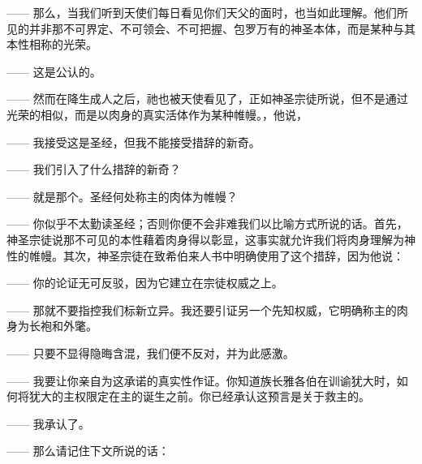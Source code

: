 —— 那么，当我们听到天使们每日看见你们天父的面时，也当如此理解。他们所见的并非那不可界定、不可领会、不可把握、包罗万有的神圣本体，而是某种与其本性相称的光荣。\par

—— 这是公认的。\par

—— 然而在降生成人之后，祂也被天使看见了，正如神圣宗徒所说，但不是通过光荣的相似，而是以肉身的真实活体作为某种帷幔。，他说，\par

—— 我接受这是圣经，但我不能接受措辞的新奇。\par

—— 我们引入了什么措辞的新奇？\par

—— 就是那个。圣经何处称主的肉体为帷幔？\par

—— 你似乎不太勤读圣经；否则你便不会非难我们以比喻方式所说的话。首先，神圣宗徒说那不可见的本性藉着肉身得以彰显，这事实就允许我们将肉身理解为神性的帷幔。其次，神圣宗徒在致希伯来人书中明确使用了这个措辞，因为他说：\par

—— 你的论证无可反驳，因为它建立在宗徒权威之上。\par

—— 那就不要指控我们标新立异。我还要引证另一个先知权威，它明确称主的肉身为长袍和外氅。\par

—— 只要不显得隐晦含混，我们便不反对，并为此感激。\par

—— 我要让你亲自为这承诺的真实性作证。你知道族长雅各伯在训谕犹大时，如何将犹大的主权限定在主的诞生之前。你已经承认这预言是关于救主的。\par

—— 我承认了。\par

—— 那么请记住下文所说的话：\par

